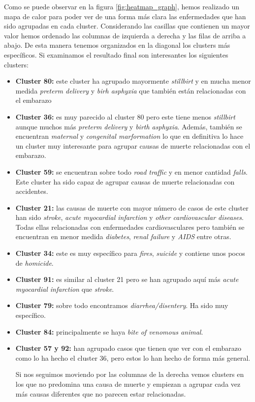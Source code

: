 \documentclass[10pt,a4paper]{article}
\begin{document}
Como se puede observar en la figura \ref{fig:heatmap_graph}, hemos realizado un mapa de calor para poder ver de una forma más clara las enfermedades que han sido agrupadas en cada cluster. Considerando las casillas que contienen un mayor valor hemos ordenado las columnas de izquierda a derecha y las filas de arriba a abajo. De esta manera tenemos organizados en la diagonal los clusters más específicos. Si examinamos el resultado final son interesantes los siguientes clusters:

\begin{itemize}
\item \textbf{Cluster 80:} este cluster ha agrupado mayormente \textit{stillbirt} y en mucha menor medida \textit{preterm delivery} y \textit{birh asphyxia} que también están relacionadas con el embarazo
\item \textbf{Cluster 36:} es muy parecido al cluster 80 pero este tiene menos \textit{stillbirt} aunque muchos más \textit{preterm delivery} y \textit{birth asphyxia}. Además, también se encuentran \textit{maternal} y \textit{congenital marformation} lo que en definitiva lo hace un cluster muy interesante para agrupar causas de muerte relacionadas con el embarazo.
\item \textbf{Cluster 59:} se encuentran sobre todo \textit{road traffic} y en menor cantidad \textit{falls}. Este cluster ha sido capaz de agrupar causas de muerte relacionadas con accidentes.
\item \textbf{Cluster 21:} las causas de muerte con mayor número de casos de este cluster han sido \textit{stroke}, \textit{acute myocardial infarction} y \textit{other cardiovascular diseases}. Todas ellas relacionadas con enfermedades cardiovasculares pero también se encuentran en menor medida \textit{diabetes}, \textit{renal failure} y \textit{AIDS} entre otras.
\item \textbf{Cluster 34:} este es muy específico para \textit{fires}, \textit{suicide} y contiene unos pocos de \textit{homicide}.
\item \textbf{Cluster 91:} es similar al cluster 21 pero se han agrupado aquí más \textit{acute myocardial infarction} que \textit{stroke}.
\item \textbf{Cluster 79:} sobre todo encontramos \textit{diarrhea/disentery}. Ha sido muy específico.
\item \textbf{Cluster 84:} principalmente se haya \textit{bite of venomous animal}.
\item \textbf{Cluster 57 y 92:} han agrupado casos que tienen que ver con el embarazo como lo ha hecho el cluster 36, pero estos lo han hecho de forma más general.

Si nos seguimos moviendo por las columnas de la derecha vemos clusters en los que no predomina una causa de muerte y empiezan a agrupar cada vez más causas diferentes que no parecen estar relacionadas.

\end{itemize}
\end{document}
